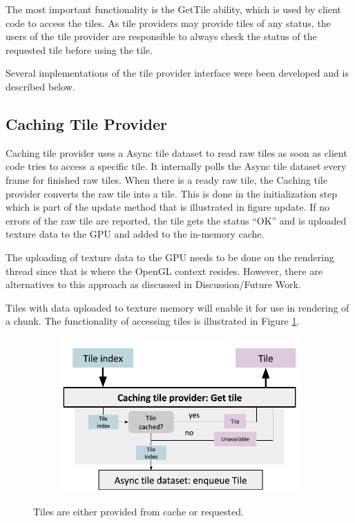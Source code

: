 The most important functionality is the GetTile ability, which is used by client code to access the tiles. As tile providers may provide tiles of any status, the users of the tile provider are responsible to always check the status of the requested tile before using the tile. 

Several implementations of the tile provider interface were been developed and is described below.

\subsection{Caching Tile Provider}
Caching tile provider uses a Async tile dataset to read raw tiles as soon as client code tries to access a specific tile. It internally polls the Async tile dataset every frame for finished raw tiles. When there is a ready raw tile, the Caching tile provider converts the raw tile into a tile. This is done in the initialization step which is part of the update method that is illustrated in figure update. If no errors of the raw tile are reported, the tile gets the status ``OK'' and is uploaded texture data to the GPU and added to the in-memory cache.

The uploading of texture data to the GPU needs to be done on the rendering thread since that is where the OpenGL context resides. However, there are alternatives to this approach as discussed in Discussion/Future Work. 

Tiles with data uploaded to texture memory will enable it for use in rendering of a chunk. The functionality of accessing tiles is illustrated in Figure \ref{fig:cachingtileprovider_gettile}.

\begin{figure}[htbp]
    \centering
    \begin{subfigure}[bt]{0.8\textwidth}
        \includegraphics[width=\textwidth]{figures/implementation/tileprovider/cachingtileprovider_gettile.pdf}
    \end{subfigure}
    \caption{Tiles are either provided from cache or requested.}
    \label{fig:cachingtileprovider_gettile}
\end{figure}

